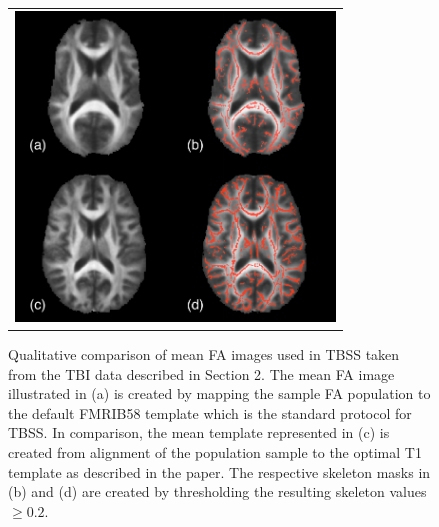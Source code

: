\documentclass[final,5p,times,twocolumn]{elsarticle}
\begin{document}
\begin{figure}
\begin{center}
\begin{tabular}{c}
  \includegraphics[width=85mm]{meanFA.pdf}
\end{tabular}
\caption{Qualitative comparison of mean FA images used in TBSS taken from the TBI data described in Section 2.  The mean FA image illustrated in (a) is created by mapping the sample FA population to the default FMRIB58 template which is the standard protocol for TBSS.  In comparison, the mean template represented in (c) is created from alignment of the population sample to the optimal T1 template as described in the paper. The respective skeleton masks in (b) and (d) are created by thresholding the resulting skeleton values $\geq 0.2$.  }
\label{fig:meanFA}
\end{center}
\end{figure}

\end{document}
